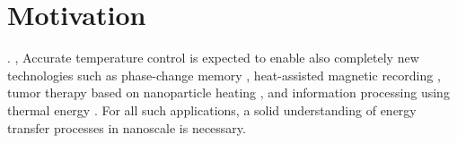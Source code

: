 \label{chap:intro}
\section{Motivation}

 \cite{cahill03,cahill14}.  \cite{snyder08,vineis10,shakouri11},  Accurate temperature control is expected to enable also completely new technologies such as phase-change memory \cite{lankhorst05}, heat-assisted magnetic recording \cite{pan09}, tumor therapy based on nanoparticle heating \cite{avedisian09}, and information processing using thermal energy \cite{li12_rmp}. For all such applications, a solid understanding of energy transfer processes in nanoscale is necessary. %



